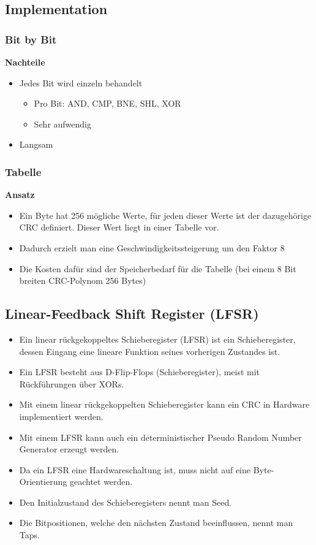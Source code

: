 \subsection{Implementation}
\subsubsection{Bit by Bit}
 

\textbf{Nachteile}
\begin{itemize}
	\item Jedes Bit wird einzeln behandelt
	\begin{itemize}
		\item Pro Bit: AND, CMP, BNE, SHL, XOR
		\item Sehr aufwendig
	\end{itemize}
	\item Langsam
\end{itemize}


\subsubsection{Tabelle}
\textbf{Ansatz}
\begin{itemize}
	\item Ein Byte hat 256 mögliche Werte, für jeden dieser Werte ist der dazugehörige CRC definiert. Dieser Wert liegt in einer Tabelle vor.
	\item Dadurch erzielt man eine Geschwindigkeitssteigerung um den Faktor 8
	\item Die Kosten dafür sind der Speicherbedarf für die Tabelle (bei einem 8 Bit breiten CRC-Polynom 256 Bytes)
\end{itemize}


\subsection{Linear-Feedback Shift Register (LFSR)}
\label{sec:LFSR}
\begin{itemize}
	\item Ein linear rückgekoppeltes Schieberegister (LFSR) ist ein Schieberegister, dessen Eingang eine lineare Funktion seines vorherigen Zustandes ist.
	\item Ein LFSR besteht aus D-Flip-Flops (Schieberegister), meist mit Rückführungen über XORs.
	\item Mit einem linear rückgekoppelten Schieberegister kann ein CRC in Hardware implementiert werden.
	\item Mit einem LFSR kann auch ein deterministischer Pseudo Random Number Generator erzeugt werden.
	\item Da ein LFSR eine Hardwareschaltung ist, muss nicht auf eine Byte-Orientierung geachtet werden.
	\item Den Initialzustand des Schieberegisters nennt man Seed.
	\item Die Bitpositionen, welche den nächsten Zustand beeinflussen, nennt man Taps.
\end{itemize}

